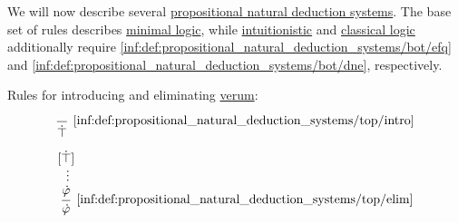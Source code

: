 \begin{definition}\label{def:propositional_natural_deduction_systems}
  We will now describe several \hyperref[def:abstract_propositional_natural_deduction_system]{propositional natural deduction systems}. The base set of rules describes \hyperref[con:minimal_logic]{minimal logic}, while \hyperref[con:intuitionistic_logic]{intuitionistic} and \hyperref[con:classical_logic]{classical logic} additionally require \ref{inf:def:propositional_natural_deduction_systems/bot/efq} and \ref{inf:def:propositional_natural_deduction_systems/bot/dne}, respectively.

  \begin{thmenum}
    \mimprovised Rules for introducing and eliminating \hyperref[def:propositional_alphabet/constants/verum]{verum}:
    \begin{paracol}{2}
      \begin{leftcolumn}
        \leavevmode\vfill
        \begin{equation*}\taglabel[\ensuremath{ \top^+ }]{inf:def:propositional_natural_deduction_systems/top/intro}
          \begin{prooftree}
            \infer0[\ref{inf:def:propositional_natural_deduction_systems/top/intro}]{ \syntop }
          \end{prooftree}
        \end{equation*}
      \end{leftcolumn}

      \begin{rightcolumn}
        \leavevmode\vfill
        \begin{equation*}\taglabel[\ensuremath{ \top^- }]{inf:def:propositional_natural_deduction_systems/top/elim}
          \begin{prooftree}
            \hypo{ [\syntop] }
            \ellipsis {} { \syn\varphi }
            \infer1[\ref{inf:def:propositional_natural_deduction_systems/top/elim}]{ \syn\varphi }
          \end{prooftree}
        \end{equation*}
      \end{rightcolumn}
    \end{paracol}


\end{thmenum}
\end{definition}
